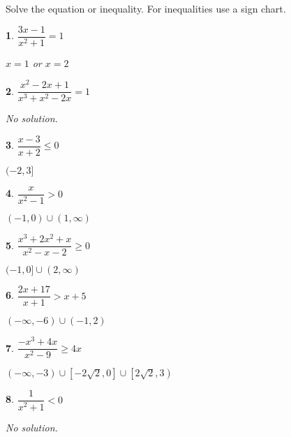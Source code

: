 \documentclass{amsbook}
\newtheorem{exc}{}
\newenvironment{ex}{\begin{exc}\normalfont}{\end{exc}}
\numberwithin{section}{chapter}
\numberwithin{equation}{chapter}
\begin{document}
Solve the equation or inequality. For inequalities use a sign chart.

\begin{multicols}{2}
	
	\begin{ex}
		$\dfrac{3x - 1}{x^{2} + 1} = 1$
		\begin{sol}
			$x = 1$ or $x=2$
		\end{sol}
	\end{ex}
	
	
	\begin{ex}
		$\dfrac{x^{2} - 2x + 1}{x^{3} + x^{2} - 2x} = 1$
		\begin{sol}
			No solution.
		\end{sol}
	\end{ex}
	
	\begin{ex}
		 $\dfrac{x - 3}{x + 2} \leq 0$
		\begin{sol}
			 $(-2, 3]$
		\end{sol}
	\end{ex}
	
	\begin{ex}
		$\dfrac{x}{x^{2} - 1} > 0$
		\begin{sol}
			 $(-1, 0) \cup (1, \infty)$
		\end{sol}
	\end{ex}
	
	\begin{ex}
		$\dfrac{x^3+2x^2+x}{x^2-x-2} \geq 0$
		\begin{sol}
			$(-1,0] \cup (2, \infty)$
		\end{sol}
	\end{ex}
	
	\begin{ex}
		$\dfrac{2x + 17}{x + 1} > x + 5$
		\begin{sol}
			$(-\infty, -6) \cup (-1, 2)$
		\end{sol}
	\end{ex}
	
	\begin{ex}
		$\dfrac{-x^{3} + 4x}{x^{2} - 9} \geq 4x$
		\begin{sol}
			$(-\infty, -3) \cup \left[-2\sqrt{2}, 0\right] \cup \left[2\sqrt{2}, 3\right)$
		\end{sol}
	\end{ex}
		
	\begin{ex}
	$\dfrac{1}{x^{2} + 1} < 0$ 	
		\begin{sol}
			No solution.
		\end{sol}
	\end{ex}
	
\end{multicols}
\end{document}

